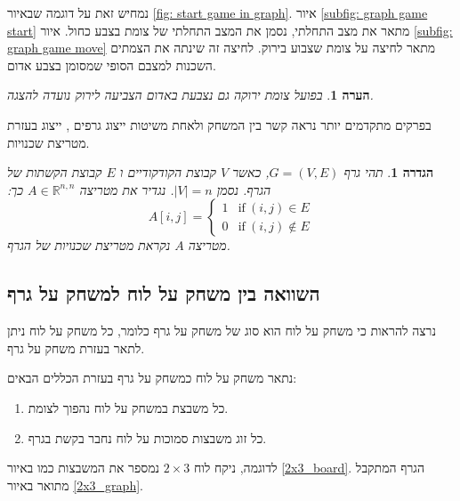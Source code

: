 \documentclass[12pt,leqno]{article}
\theoremstyle{theoremdd}
\newtheorem{definition}{הגדרה}[section]
\newtheorem{comm}{הערה}[section]
\begin{document}
נמחיש זאת על דוגמה שבאיור
\ref{fig: start game in graph}.
איור 
\ref{subfig: graph game start}
מתאר את מצב התחלתי, נסמן את המצב התחלתי של צומת בצבע כחול.
איור
\ref{subfig: graph game move}
מתאר לחיצה על צומת שצבוע בירוק.
לחיצה זה שינתה את הצמתים השכנות למצבם הסופי שמסומן בצבע אדום.
\begin{comm}
    בפועל צומת ירוקה גם נצבעת באדום הצביעה לירוק נועדה להצגה.
\end{comm}
בפרקים מתקדמים יותר נראה קשר בין המשחק ולאחת משיטות ייצוג גרפים
,
ייצוג בעזרת מטריצת שכנויות.
\begin{definition}
    \label{def:graphs-neighbor-matrix}
    תהי גרף 
    $G = (V,E)$,
    כאשר 
    $V$
    קבוצת הקודקודיים 
    ו
    $E$
    קבוצת הקשתות של הגרף.
    נסמן  
    $|V| = n$.
    נגדיר את מטריצה 
    $A \in \mathbb{R}^{n,n} $
    כך:
    \[ A[i,j] = 
    \begin{cases}
        1 & \text{if} \ (i,j) \in E \\
        0 & \text{if} \ (i,j) \notin E
    \end{cases}
    \]
    מטריצה 
    $A$
    נקראת מטריצת שכנויות של הגרף.
\end{definition}

\subsection{השוואה בין משחק על לוח למשחק על גרף}
נרצה להראות כי משחק על לוח הוא סוג של משחק על גרף
כלומר, כל משחק על לוח ניתן לתאר בעזרת משחק על גרף.

נתאר משחק על לוח כמשחק על גרף בעזרת הכללים הבאים:
\begin{enumerate}
    \item 
    כל משבצת במשחק על לוח נהפוך לצומת.
    \item 
    כל זוג משבצות סמוכות על לוח נחבר בקשת בגרף.
\end{enumerate}

לדוגמה, ניקח לוח
$2 \times 3$
נמספר את המשבצות כמו באיור
\ref{2x3_board}.
הגרף המתקבל מתואר באיור
\ref{2x3_graph}.
\end{document}
